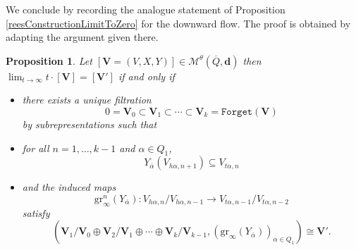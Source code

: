 \documentclass{amsart}
\theoremstyle{plain}
\newtheorem{proposition}[theorem]{Proposition}
\numberwithin{equation}{section}
\theoremstyle{definition}
\theoremstyle{remark}
\begin{document}

	We conclude by recording the analogue statement of Proposition \ref{reesConstructionLimitToZero} for the downward flow. The proof is obtained by adapting the argument given there.
	\begin{proposition}
		Let $[\mathbf{V}=(V,X,Y)]\in \mathcal{M}^{\theta}(\overline{Q},\mathbf{d})$ then $\lim_{t\to \infty}t\cdot[\mathbf{V}]=[\mathbf{V}']$ if and only if 
		\begin{itemize}
			\item there exists a unique filtration 
			{\normalfont
				$$
				0=\mathbf{V}_0\subset \mathbf{V}_1\subset\cdots\subset \mathbf{V}_k=\texttt{Forget}(\mathbf{V})
				$$}
			by subrepresentations such that 
			\item for all $n=1,\ldots,k-1$ and $\alpha\in Q_1$, 
			$$Y_{\overline{\alpha}}(V_{h\alpha,n+1})\subseteq V_{t\alpha,n}$$
			\item and the induced maps 
			{\normalfont$$
				\text{gr}^{n}_\infty(Y_{\overline{\alpha}}):V_{h\alpha,n}/V_{h\alpha,n-1}\to V_{t\alpha,n-1}/V_{t\alpha,n-2}
				$$}
			satisfy 
			{\normalfont
				$$
				(\mathbf{V}_1/\mathbf{V}_0\oplus \mathbf{V}_2/\mathbf{V}_1\oplus\cdots \oplus \mathbf{V}_k/\mathbf{V}_{k-1},(\text{gr}_\infty(Y_{\overline{\alpha}}))_{\alpha\in Q_1})\cong \mathbf{V}'.
				$$}
		\end{itemize}
		
	\end{proposition}
	
\end{document}
